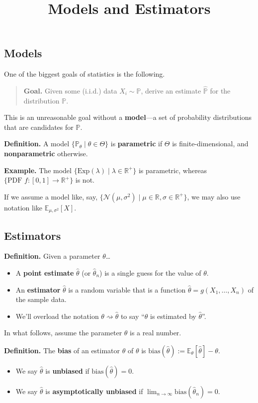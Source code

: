 \title{Models and Estimators}



\subsection{Models}

One of the biggest goals of statistics is the following.

\begin{quote}
    \textbf{Goal.} Given some (i.i.d.) data $X_i \sim \mathbb{P}$,
    derive an estimate $\hat{\mathbb{P}}$ for the distribution $\mathbb{P}$.
\end{quote}

This is an unreasonable goal without a \textbf{model}---a set of probability distributions
that are candidates for $\mathbb{P}$.

\textbf{Definition.} A model $\{\mathbb{P}_{\theta} \mid \theta \in \Theta\}$ is
\textbf{parametric} if $\Theta$ is finite-dimensional, and \textbf{nonparametric} otherwise.

\textbf{Example.} The model $\{\mathrm{Exp}(\lambda) \mid \lambda \in \mathbb{R}^+\}$
is parametric, whereas $\{\text{PDF } f: [0, 1] \to \mathbb{R}^+\}$ is not.

If we assume a model like, say,
$\{\mathcal{N}(\mu, \sigma^2) \mid \mu \in \mathbb{R},\sigma \in \mathbb{R}^+\}$,
we may also use notation like $\mathbb{E}_{\mu, \sigma^2}[X]$.

\subsection{Estimators}

\textbf{Definition.} Given a parameter $\theta$\dots
\begin{itemize}
    \item A \textbf{point estimate} $\hat{\theta}$ (or $\hat{\theta}_n$)
    is a single guess for the value of $\theta$.
    \item An \textbf{estimator} $\hat{\theta}$ is a random variable
    that is a function $\hat{\theta} = g(X_1, \dots, X_n)$ of the sample data.
    \item We'll overload the notation $\theta \rightsquigarrow \hat{\theta}$ to say
    ``$\theta$ is estimated by $\hat{\theta}$''.
\end{itemize}

In what follows, assume the parameter $\theta$ is a real number.

\textbf{Definition.} The \textbf{bias} of an estimator $\hat{\theta}$ of $\theta$
is $\mathrm{bias}(\hat{\theta}) := \mathbb{E}_{\theta}[\hat{\theta}] - \theta$.
\begin{itemize}
    \item We say $\hat{\theta}$ is \textbf{unbiased} if $\mathrm{bias}(\hat{\theta}) = 0$.
    \item We say $\hat{\theta}$ is \textbf{asymptotically unbiased} if
    $\lim_{n \to \infty} \mathrm{bias}(\hat{\theta}_n) = 0$.
\end{itemize}

